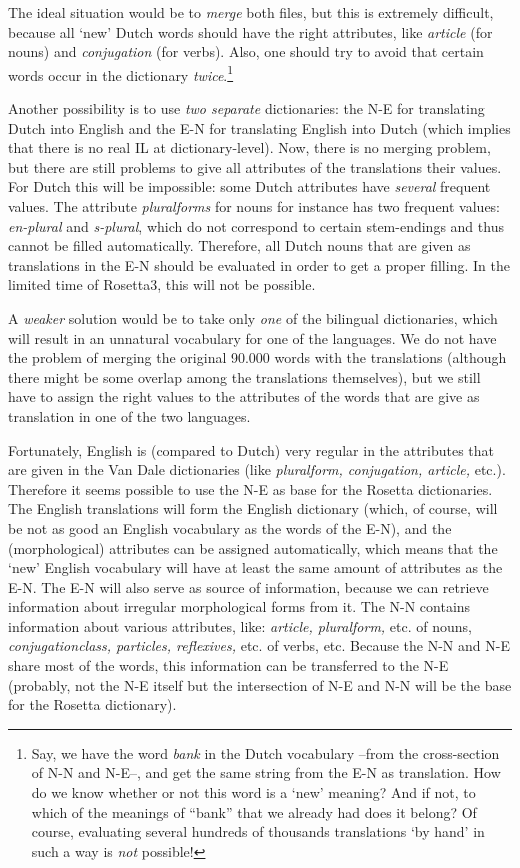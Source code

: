 The ideal situation would be to {\em merge} both files, but this is extremely 
difficult, because all `new' Dutch words should have the right attributes, 
like {\em article} (for nouns) and 
{\em conjugation} (for verbs). Also, one should try to avoid that 
certain words occur in the dictionary {\em twice}.\footnote{Say, we have the 
word 
{\em bank} in the Dutch vocabulary --from the cross-section of N-N and N-E--, 
and get the same string from the E-N as translation. How do we know 
whether or not this word
is a `new' meaning? And if not, to which of the meanings of ``bank'' that we 
already had does it belong? 
Of course, evaluating several hundreds of thousands translations
`by hand' in such a way is {\em not} possible!}
 
Another possibility is to use {\em two separate} dictionaries: the N-E for 
translating Dutch into English and the E-N for translating English into Dutch
(which implies that there is no real IL at dictionary-level). Now, there is 
no merging problem, but there are still problems to give all attributes of the
translations their values. For Dutch this will be impossible: some Dutch 
attributes have {\em several} frequent values. 
The attribute {\em pluralforms} for nouns for instance has two frequent
values: {\em en-plural} and {\em s-plural}, which do not correspond to
certain stem-endings and thus cannot be filled automatically. 
Therefore, all Dutch nouns that are given as translations 
in the E-N should be evaluated in order to get a proper filling.
In the limited time of Rosetta3, this will not be possible.
 
A {\em weaker} solution would be to take only {\em one} 
of the bilingual dictionaries,
which will result in an unnatural vocabulary for one of the languages. We
do not have the problem of merging the original 90.000 words with the 
translations (although there might be some overlap among the translations 
themselves), but we still have to assign the right values to the attributes 
of the words that are give as translation in one of the two languages. 
 
Fortunately, English is (compared to Dutch) very regular
in the attributes that are given in the Van Dale dictionaries (like 
{\em pluralform, conjugation, article,} etc.).
Therefore it seems possible to use the N-E as base for the Rosetta 
dictionaries.
The English translations will form the English dictionary (which, of course,
will be not as good an English vocabulary as the words of the E-N), and the 
(morphological) attributes can be assigned automatically, which means that the 
`new' English vocabulary will have at least the same amount of attributes 
as the E-N.
The E-N will also serve as source of information, because we can retrieve 
information about irregular morphological forms from it.
The N-N contains information about various attributes, like: 
{\em article, pluralform,} etc. of nouns, 
{\em conjugationclass, particles, reflexives,} etc. of verbs, etc.
Because the N-N and N-E share most of the words, this information can be 
transferred to the N-E (probably, not the N-E itself but the intersection 
of N-E and N-N will be the base for the Rosetta dictionary).
 
